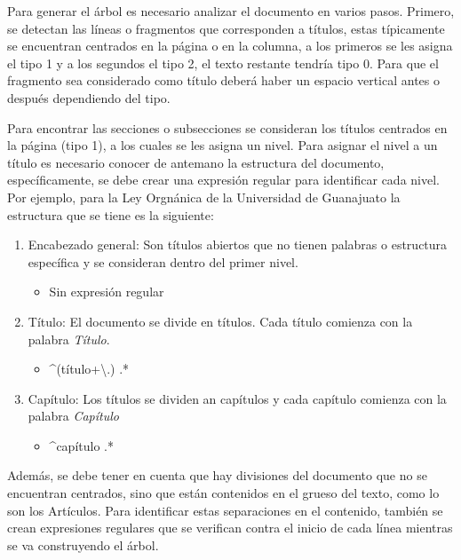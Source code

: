 Para generar el árbol es necesario analizar el documento en varios pasos. Primero,
se detectan las líneas o fragmentos que corresponden a títulos, estas típicamente
se encuentran centrados en la página o en la columna, a los primeros se les
asigna el tipo 1 y a los segundos el tipo 2, el texto restante tendría tipo 0.
Para que el fragmento sea considerado como título deberá haber un espacio
vertical antes o después dependiendo del tipo.

Para encontrar las secciones o subsecciones se consideran los títulos
centrados en la página (tipo 1), a los cuales se les asigna un nivel. Para asignar
el nivel a un título es necesario conocer de antemano la estructura del
documento, específicamente, se debe crear una expresión regular para
identificar cada nivel. Por ejemplo, para la Ley Orgnánica de la Universidad
de Guanajuato la estructura que se tiene es la siguiente:

\begin{enumerate}
    \item Encabezado general: Son títulos abiertos que no tienen palabras o
          estructura específica y se consideran dentro del primer nivel.
          \begin{itemize}
              \item Sin expresión regular
          \end{itemize}
    \item Título: El documento se divide en títulos. Cada título comienza con
          la palabra \textit{Título}.
          \begin{itemize}
              \item \string^(título\textbar[xiv]+\textbackslash.) .*
          \end{itemize}
    \item Capítulo: Los títulos se dividen an capítulos y cada capítulo comienza
          con la palabra \textit{Capítulo}
          \begin{itemize}
              \item \string^capítulo .*
          \end{itemize}
\end{enumerate}

Además, se debe tener en cuenta que hay divisiones del documento
que no se encuentran centrados, sino que están contenidos en el grueso del
texto, como lo son los Artículos. Para identificar estas separaciones en el
contenido, también se crean expresiones regulares que se verifican contra el
inicio de cada línea mientras se va construyendo el árbol.

